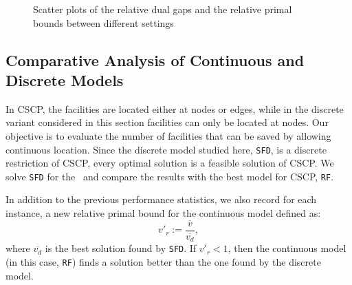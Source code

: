  \begin{figure}[!h]
\caption{Scatter plots of the relative dual gaps and the relative primal bounds between different settings}
\label{fig.scatter5}
\end{figure}

\subsection{Comparative Analysis of Continuous and Discrete Models}

 In  CSCP, the facilities are located either at nodes or edges, while in the discrete variant considered in this section facilities can only be located at nodes.
Our objective is to evaluate the number of facilities that can be saved by allowing continuous location. Since the discrete model studied here, \texttt{SFD}, is a discrete restriction of CSCP,  every optimal solution is a feasible solution of CSCP.
 We solve \texttt{SFD} for the \dfproblem \,  and compare the results with the best model for CSCP, \texttt{RF}.


In addition to the previous performance statistics, we also record for each instance, a new relative primal bound for the continuous model defined as:
$$v'_r := \frac{\overline{v}}{\overline{v_d}},$$ where $\overline{v_d}$ is the best solution found by \texttt{SFD}.  If $v'_r < 1$, then the continuous model (in this case, \texttt{RF}) finds a solution better than the one found by the discrete model.



